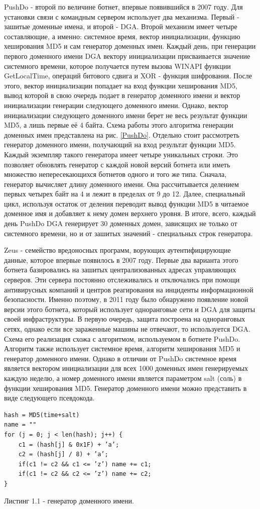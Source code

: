 PushDo - второй по величине ботнет, впервые появившийся в 2007 году. Для установки связи с командным сервером использует два механизма. Первый - зашитые доменные имена, и второй - DGA. Второй механизм имеет четыре составляющие, а именно: системное время, вектор инициализации, функцию хеширования MD5 и сам генератор доменных имен. Каждый день, при генерации первого доменного имени DGA вектору инициализации присваивается значение системного времени, которое получается путем вызова WINAPI функции GetLocalTime, операций битового сдвига и XOR - функция шифрования. После этого, вектор инициализации попадает на вход функции хеширования MD5, вывод которой в свою очередь подает в генератор доменного имени и вектор инициализации генерации следующего доменного имени. Однако, вектор инициализации следующего доменного имени берет не весь результат функции MD5, а лишь первые её 4 байта. Схема работы этого алгоритма генерации доменных имен представлена на рис. \ref{PushDo}.
Отдельно стоит рассмотреть генератор доменного имени, получающий на вход результат функции MD5. Каждый экземпляр такого генератора имеет четыре уникальных строки. Это позволяет обновлять генератор с каждой новой версий ботнета или иметь множество непересекающихся ботнетов одного и того же типа. Сначала, генератор вычисляет длину доменного имени. Она рассчитывается делением первых четырех байт на 4 и лежит в пределах от 9 до 12. Далее, специальный цикл, используя остаток от деления переводит вывод функции MD5 в читаемое доменное имя и добавляет к нему домен верхнего уровня. В итоге, всего, каждый день PushDo DGA генерирует 30 доменных домен, зависящих не только от системного времени, но и от зашитых значений - специальных строк генератора.

Zeus - семейство вредоносных программ, ворующих аутентифицирующие данные, которое впервые появилось в 2007 году. Первые два варианта этого ботнета базировались на зашитых централизованных адресах управляющих серверов. Эти сервера постоянно отслеживались и отключались при помощи антивирусных компаний и центров реагирования на инциденты информационной безопасности. Именно поэтому, в 2011 году было обнаружено появление новой версии этого ботнета, который использует одноранговые сети и DGA для защиты своей инфраструктуры. В первую очередь, защита построена на одноранговых сетях, однако если все зараженные машины не отвечают, то используется DGA. Схема его реализация схожа с алгоритмом, используемом в ботнете PushDo. Алгоритм также использует системное время, алгоритм хеширования MD5 и генератор доменного имени. Однако в отличии от PushDo системное время является вектором инициализации для всех 1000 доменных имен генерируемых каждую неделю, а номер доменного имени является параметром salt (соль) в функции хеширования MD5. Генератор доменного имени можно представить в виде следующего псевдокода.
\begin{lstlisting}
hash = MD5(time+salt)
name = ""
for (j = 0; j < len(hash); j++) {
    c1 = (hash[j] & 0x1F) + ’a’;
    c2 = (hash[j] / 8) + ’a’;
    if(c1 != c2 && c1 <= ’z’) name += c1;
    if(c1 != c2 && c2 <= ’z’) name += c2;
}
\end{lstlisting}
Листинг 1.1 - генератор доменного имени.

